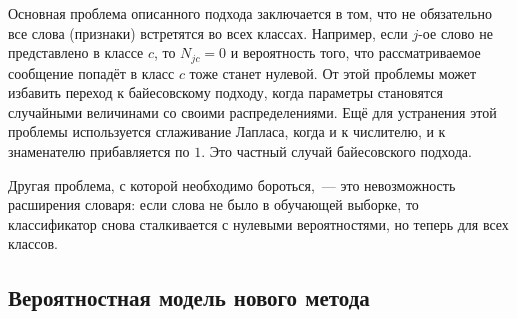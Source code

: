 Основная проблема описанного подхода заключается в том, что не обязательно все слова (признаки)
встретятся во всех классах. Например, если $j$-ое слово не представлено в классе $c$, то $N_{jc}=0$
и вероятность того, что рассматриваемое сообщение попадёт в класс $c$ тоже станет нулевой. От этой
проблемы может избавить переход к байесовскому подходу, когда параметры становятся случайными
величинами со своими распределениями. Ещё для устранения этой проблемы
используется сглаживание Лапласа\cite{field1988laplacian}, когда и к
числителю, и к знаменателю прибавляется по $1$.
Это частный случай байесовского подхода.

Другая проблема, с которой необходимо бороться,~--- это невозможность расширения словаря: если слова
не было в обучающей выборке, то классификатор снова сталкивается с нулевыми вероятностями, но теперь
для всех классов.

\subsection{Вероятностная модель нового метода}

